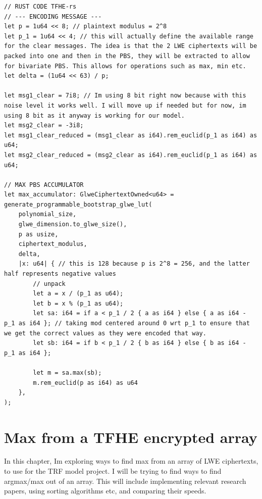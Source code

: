 \documentclass{report}
\begin{document}
\begin{verbatim}
// RUST CODE TFHE-rs
// --- ENCODING MESSAGE ---
let p = 1u64 << 8; // plaintext modulus = 2^8
let p_1 = 1u64 << 4; // this will actually define the available range for the clear messages. The idea is that the 2 LWE ciphertexts will be packed into one and then in the PBS, they will be extracted to allow for bivariate PBS. This allows for operations such as max, min etc.
let delta = (1u64 << 63) / p;

let msg1_clear = 7i8; // Im using 8 bit right now because with this noise level it works well. I will move up if needed but for now, im using 8 bit as it anyway is working for our model.
let msg2_clear = -3i8;
let msg1_clear_reduced = (msg1_clear as i64).rem_euclid(p_1 as i64) as u64;
let msg2_clear_reduced = (msg2_clear as i64).rem_euclid(p_1 as i64) as u64;

// MAX PBS ACCUMULATOR
let max_accumulator: GlweCiphertextOwned<u64> = generate_programmable_bootstrap_glwe_lut(
	polynomial_size,
	glwe_dimension.to_glwe_size(),
	p as usize,
	ciphertext_modulus,
	delta,
	|x: u64| { // this is 128 because p is 2^8 = 256, and the latter half represents negative values
		// unpack
		let a = x / (p_1 as u64);
		let b = x % (p_1 as u64);
		let sa: i64 = if a < p_1 / 2 { a as i64 } else { a as i64 - p_1 as i64 }; // taking mod centered around 0 wrt p_1 to ensure that we get the correct values as they were encoded that way.
		let sb: i64 = if b < p_1 / 2 { b as i64 } else { b as i64 - p_1 as i64 };
		
		let m = sa.max(sb);
		m.rem_euclid(p as i64) as u64
	},
);
\end{verbatim}

\chapter{Max from a TFHE encrypted array}
In this chapter, Im exploring ways to find max from an array of LWE ciphertexts, to use for the TRF model project. I will be trying to find ways to find argmax/max out of an array. This will include implementing relevant research papers, using sorting algorithms etc, and comparing their speeds.
\end{document}
